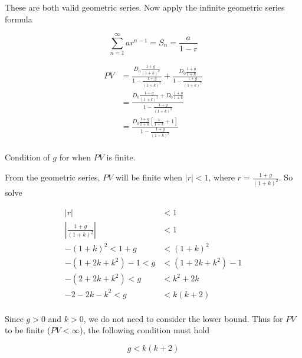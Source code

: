 \documentclass[11pt]{article}
\begin{document}
These are both valid geometric series. Now apply the infinite geometric
series formula

\[\sum_{n=1}^{\infty} a r^{n - 1} = S_n =\frac{a}{1-r}\]

\begin{align}
    PV &= \frac{D_0 \frac{1 + g}{(1 + k)^2}}{1 - \frac{1 + g}{(1 + k)^2}} + \frac{D_0 \frac{1 + g}{1 + k}}{1 - \frac{1 + g}{(1 + k)^2}} \\
    &= \frac{D_0 \frac{1 + g}{(1 + k)^2} + D_0 \frac{1 + g}{1 + k}}{1 - \frac{1 + g}{(1 + k)^2}} \\
    &= \frac{D_0 \frac{1 + g}{1 + k} \left[\frac{1}{1 + k} + 1\right]}{1 - \frac{1 + g}{(1 + k)^2}} \\
\end{align}

    Condition of \(g\) for when \(PV\) is finite.

From the geometric series, \(PV\) will be finite when \(|r| < 1\), where
\(r = \frac{1 + g}{(1 + k)^2}\). So solve

\begin{align}
    |r| &< 1 \\
    \left|\frac{1 + g}{(1 + k)^2} \right| &< 1 \\
    -(1 + k)^2 < 1 + g &< (1 + k)^2 \\
    -(1 + 2k + k^2) - 1 < g &< (1 + 2k + k^2) - 1 \\
    -(2 + 2k + k^2) < g &< k^2 + 2k \\
    -2 - 2k - k^2 < g &< k(k + 2) \\
\end{align}

Since \(g > 0\) and \(k > 0\), we do not need to consider the lower
bound. Thus for \(PV\) to be finite (\(PV < \infty\)), the following
condition must hold

\[g < k(k + 2)\]


    
    
    
\end{document}
